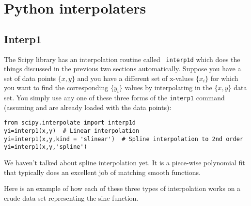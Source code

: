 \section{Python interpolaters}

\subsection*{Interp1}
 The Scipy library has an interpolation routine called {\tt
interp1d} which does the things discussed in the previous two sections
automatically. Suppose you have a set of data points $\{x,y\}$ and
you have a different set of x-values $\{x_i\}$ for which you want to
find the corresponding $\{y_i\}$ values by interpolating in the
$\{x,y\}$ data set. You simply use any one of these three forms of
the {\tt interp1} command (assuming  and  are already
loaded with the data points):
\begin{Verbatim}
from scipy.interpolate import interp1d
yi=interp1(x,y)  # Linear interpolation
yi=interp1(x,y,kind = 'slinear')  # Spline interpolation to 2nd order
yi=interp1(x,y,'spline')
\end{Verbatim}
We haven't talked about spline interpolation yet.  It is a
piece-wise polynomial fit that typically does an excellent job of
matching smooth functions.

Here is an example of how each of these three types of interpolation
works on a crude data set representing the sine function.

